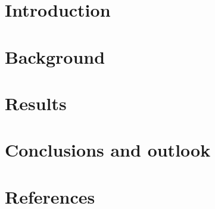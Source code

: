 \documentclass[a4paper, 12pt]{article}
\begin{document}

\section{Introduction}


\newpage

\section{Background}


\newpage
\section{Results}

\newpage
\section{Conclusions and outlook}


\newpage
\section*{References}


%
%
\newpage

\appendix
\end{document}
